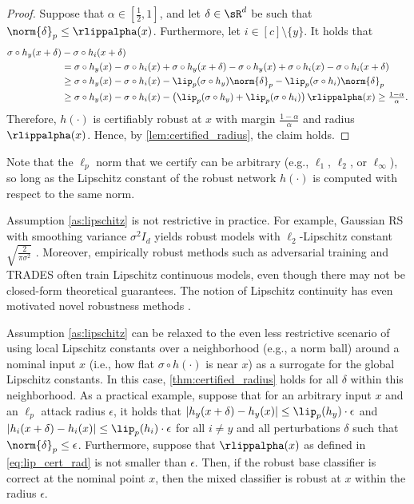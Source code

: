 \documentclass[11pt, letterpaper]{article}
\theoremstyle{plain}
\theoremstyle{definition}
\begin{document}
\begin{proof}
	Suppose that $\alpha \in [\frac{1}{2}, 1]$, and let $\delta \in \sR^d$ be such that $\norm{\delta}_p \le \rlippalpha (x)$. Furthermore, let $i \in [c] \setminus \{y\}$. It holds that
	\begin{align*}
		\sigma \circ h_y (x+\delta) & - \sigma \circ h_i (x+\delta) \\
		& = \sigma \circ h_y(x) - \sigma \circ h_i(x) + \sigma \circ h_y(x+\delta) - \sigma \circ h_y(x) + \sigma \circ h_i(x) - \sigma \circ h_i(x+\delta) \\
		& \ge \sigma \circ h_y(x) - \sigma \circ h_i(x) - \lip_p (\sigma \circ h_y) \norm{\delta}_p - \lip_p (\sigma \circ h_i) \norm{\delta}_p \\
		& \ge \sigma \circ h_y(x) - \sigma \circ h_i(x) - \left( \lip_p (\sigma \circ h_y) + \lip_p (\sigma \circ h_i) \right) \rlippalpha (x) \ge \tfrac{1 - \alpha} {\alpha}.
	\end{align*}
	Therefore, $h (\cdot)$ is certifiably robust at $x$ with margin $\frac{1-\alpha} {\alpha}$ and radius $\rlippalpha (x)$. Hence, by \cref{lem:certified_radius}, the claim holds.
\end{proof}

Note that the $\ell_p$ norm that we certify can be arbitrary (e.g., $\ell_1$, $\ell_2$, or $\ell_\infty$), so long as the Lipschitz constant of the robust network $h (\cdot)$ is computed with respect to the same norm.

Assumption \ref{as:lipschitz} is not restrictive in practice. For example, Gaussian RS with smoothing variance $\sigma^2 I_d$ yields robust models with $\ell_2$-Lipschitz constant $\sqrt{ \frac{2} {\pi \sigma^2} }$ \cite{Salman19}. Moreover, empirically robust methods such as adversarial training and TRADES often train Lipschitz continuous models, even though there may not be closed-form theoretical guarantees. The notion of Lipschitz continuity has even motivated novel robustness methods \citep{Moosavi-Dezfooli19, Terjek20}.

Assumption \ref{as:lipschitz} can be relaxed to the even less restrictive scenario of using local Lipschitz constants over a neighborhood (e.g., a norm ball) around a nominal input $x$ (i.e., how flat $\sigma \circ h (\cdot)$ is near $x$) as a surrogate for the global Lipschitz constants. In this case, \cref{thm:certified_radius} holds for all $\delta$ within this neighborhood. As a practical example, suppose that for an arbitrary input $x$ and an $\ell_p$ attack radius $\epsilon$, it holds that $|h_y (x + \delta) - h_y (x)| \le \lip_p(h_y) \cdot \epsilon$ and $|h_i (x + \delta) - h_i (x)| \le \lip_p(h_i) \cdot \epsilon$ for all $i \neq y$ and all perturbations $\delta$ such that $\norm{\delta}_p \leq \epsilon$. Furthermore, suppose that $\rlippalpha (x)$ as defined in \cref{eq:lip_cert_rad} is not smaller than $\epsilon$. Then, if the robust base classifier is correct at the nominal point $x$, then the mixed classifier is robust at $x$ within the radius $\epsilon$.
\end{document}
